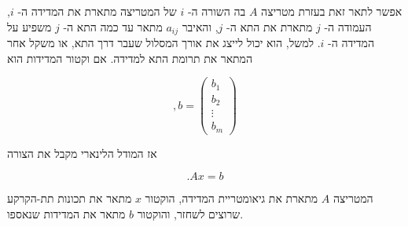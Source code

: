 \documentclass[12pt]{report}
\theoremstyle{plain}
\theoremstyle{definition}
\newcommand{\0}{\mathbf{0}}
\begin{document}
אפשר לתאר זאת בעזרת מטריצה
$A$
בה
השורה ה-
$i$
של המטריצה מתארת את המדידה ה-
$i$,
העמודה ה-
$j$
מתארת את התא ה-
$j$,
והאיבר
$a_{ij}$
מתאר עד כמה התא ה-
$j$
משפיע על המדידה ה-
$i$.
למשל, הוא יכול לייצג את אורך המסלול שעבר דרך התא, או משקל אחר המתאר את תרומת התא למדידה. אם וקטור המדידות הוא

$$
,b =
\begin{pmatrix}
b_1\\
b_2\\
\vdots\\
b_m
\end{pmatrix}
$$

אז המודל הלינארי מקבל את הצורה

$$
.Ax=b
$$

המטריצה
$A$
מתארת את גיאומטריית המדידה, הוקטור
$x$
מתאר את תכונות תת-הקרקע שרוצים לשחזר, והוקטור
$b$
מתאר את המדידות שנאספו.
\end{document}
